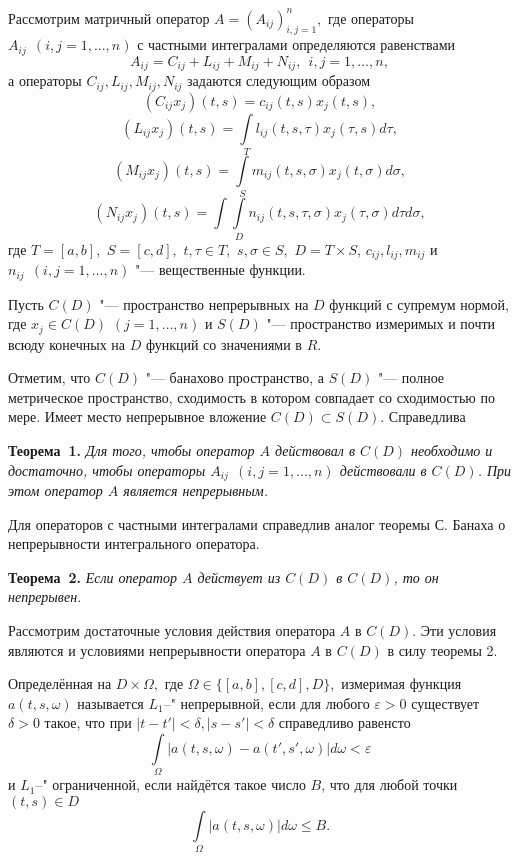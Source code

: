 \vzmscaption

Рассмотрим матричный оператор $A= (A_{ij})_{i,j=1}^n,$
где операторы $A_{ij} \ \ (i,j=1,...,n)$ с частными интегралами определяются равенствами
$$
A_{ij}=C_{ij}+L_{ij}+M_{ij}+N_{ij}, \ \ i,j=1,...,n,
$$
а операторы $C_{ij},L_{ij},M_{ij},N_{ij}$ задаются следующим образом
$$
(C_{ij}x_j)(t,s)=c_{ij}(t,s)x_j(t,s),
$$
$$
(L_{ij}x_j)(t,s)=\int\limits_T l_{ij}(t,s,\tau)x_j(\tau,s)d\tau,
$$
$$
(M_{ij}x_j)(t,s)=\int\limits_S m_{ij}(t,s,\sigma)x_j(t,\sigma)d\sigma,
$$
$$
(N_{ij}x_j)(t,s)=\int\int\limits_D n_{ij}(t,s,\tau,\sigma)x_j(\tau,\sigma)d\tau d\sigma,
$$
где $T=[a,b],$ $S=[c,d],$ $t,\tau\in T,$ $s,\sigma\in S,$ $D=T\times S $, $c_{ij}, l_{ij}, m_{ij}$ и $n_{ij} \ \ (i,j=1,...,n)$ "--- вещественные функции.

Пусть $C(D)$ "--- пространство непрерывных на $D$ функций с супремум нормой, где $x_j\in C(D)$ $(j=1,\dots,n)$ и $S(D)$ "--- пространство измеримых и почти всюду конечных на $D$ функций со значениями в $R$.

Отметим, что $C(D)$ "--- банахово пространство, а $S(D)$ "--- полное
метрическое пространство, сходимость в котором совпадает со
сходимостью по мере. Имеет место непрерывное вложение
$C(D)\subset S(D)$. Справедлива

\textbf{Теорема~1.} {\it Для того, чтобы оператор $A$ действовал в $C(D)$ необходимо и достаточно, чтобы операторы $A_{ij} \ \ (i,j=1,...,n)$ действовали в $C(D)$. При этом оператор $A$ является непрерывным.}

Для операторов с частными интегралами справедлив аналог теоремы
С. Банаха о непрерывности интегрального оператора.

\textbf{Теорема~2.} {\it Если оператор $A$ действует из $C(D)$ в $C(D)$, то он непрерывен.}

Рассмотрим достаточные условия действия оператора $A$ в
$C(D)$. Эти условия являются и условиями непрерывности оператора
$A$ в $C(D)$ в силу теоремы 2.

Определённая на $D\times\Omega,$ где $\Omega\in\{[a,b], [c,d], D\},$ измеримая функция $a(t,s,\omega)$ называется $L_1$--" непрерывной, если для любого $\varepsilon>0$ существует $\delta>0$ такое, что при $|t-t'|<\delta, |s-s'|<\delta$ справедливо равенсто
$$
\int\limits_\Omega|a(t,s,\omega)-a(t',s',\omega)|d\omega<\varepsilon
$$
и $L_1$--" ограниченной, если найдётся такое число $B$, что для любой точки
$(t,s)\in D$
$$
\int\limits_\Omega|a(t,s,\omega)|d\omega\le B.
$$


